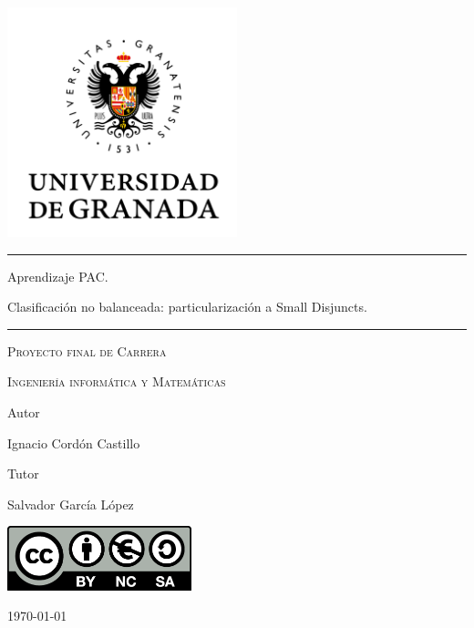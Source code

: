 
\begin{titlepage}
	\centering
	\includegraphics[width=0.5\textwidth]{./imgs/ugr.png}\par
	\vspace{1cm}
        \rule{\textwidth}{0.3em}\hfill
        {\huge 
	  Aprendizaje PAC. \par
	  Clasificación no balanceada:
	  particularización a Small Disjuncts.\par}
        \rule{\textwidth}{0.3em}\hfill
	\vspace{1cm}
        {\scshape Proyecto final de Carrera\par}
        {\scshape Ingeniería informática y Matemáticas\par}
        \vfill
        {Autor \par}
	{Ignacio Cordón Castillo \par}
	{Tutor \par}
	{Salvador García López \par}
	\vfill
      	\includegraphics[width=0.4\textwidth]{./imgs/by-nc-sa.png}\par
	{\large \today\par}
\end{titlepage}